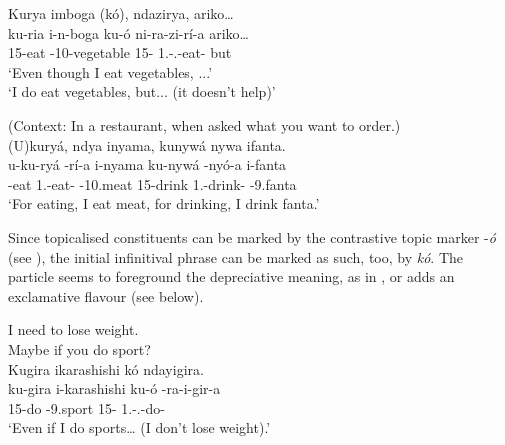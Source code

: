 \documentclass[output=paper]{langscibook}
\begin{document}
\ea
\label{bkm:Ref80458229}
Kurya imboga (kó), ndazirya, ariko…\\
\gll
ku-ria  i-n-boga  ku-ó  ni-ra-zi-rí-a  ariko…\\
15-eat  \AUG{}-10-vegetable  15-\CM{}  1\SG.\SM-\PRS.\OM{}-eat-\FV{}  but\\
\glt
‘Even though I eat vegetables, ...’\\
‘I do eat vegetables, but... (it doesn’t help)’


\z

\ea
\label{bkm:Ref78492154}
(Context: In a restaurant, when asked what you want to order.)\\
(U)kuryá, ndya inyama, kunywá nywa ifanta.\\
\gll
u-ku-ryá  \N{}-rí-a  i-nyama  ku-nywá  \N{}-nyó-a  i-fanta\\
-eat  1\SG.\SM{}-eat-\FV{}  \AUG-10.meat  15-drink  1\SG.\SM{}-drink-\FV{}  \AUG{}-9.fanta\\
\glt
‘For eating, I eat meat, for drinking, I drink fanta.’\\

\z

Since topicalised constituents can be marked by the contrastive topic marker -\textit{ó} (see ), the initial infinitival phrase can be marked as such, too, by \textit{kó}. The particle seems to foreground the depreciative meaning, as in , or adds an exclamative flavour (see  below).

\ea
\label{bkm:Ref81494620}
\begin{xlist}
 I need to lose weight. \\
 Maybe if you do sport?\\
Kugira ikarashishi kó ndayigira.\\
\gll
ku-gira  i-karashishi  ku-ó  \N{}-ra-i-gir-a\\
15-do  \AUG{}-9.sport  15-\CM{}  1\SG.\SM-\PRS.\OM{}-do-\FV{}\\
\glt
‘Even if I do sports… (I don’t lose weight).’\\

\end{xlist}
\z
\end{document}
